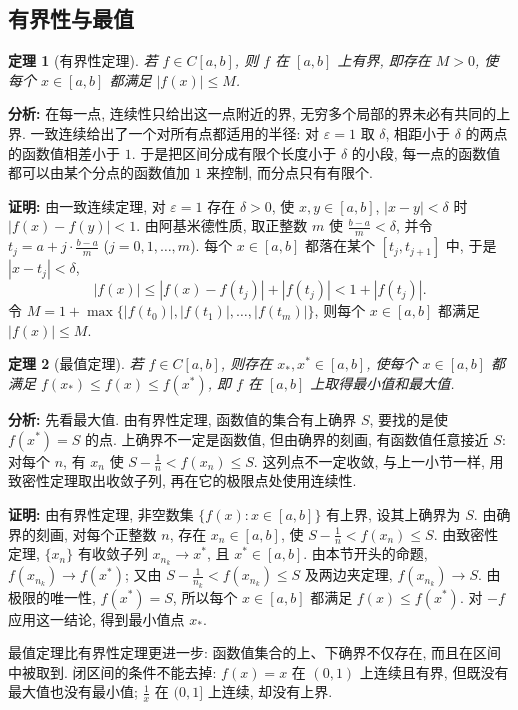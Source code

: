 \documentclass[UTF8,openany]{ctexbook}
\theoremstyle{chinesetextbook}
\newtheorem{theorem}{定理}[section]
\newenvironment{cnproof}{\par\indent\textbf{证明:} \ignorespaces}{\par}
\begin{document}
\subsection{有界性与最值}
\begin{theorem}[有界性定理]
若 $f\in C[a,b]$, 则 $f$ 在 $[a,b]$ 上有界, 即存在 $M>0$, 使每个 $x\in[a,b]$ 都满足 $|f(x)|\le M$.
\end{theorem}
\par\indent\textbf{分析:} 在每一点, 连续性只给出这一点附近的界, 无穷多个局部的界未必有共同的上界. 一致连续给出了一个对所有点都适用的半径: 对 $\varepsilon=1$ 取 $\delta$, 相距小于 $\delta$ 的两点的函数值相差小于 $1$. 于是把区间分成有限个长度小于 $\delta$ 的小段, 每一点的函数值都可以由某个分点的函数值加 $1$ 来控制, 而分点只有有限个.
\begin{cnproof}
由一致连续定理, 对 $\varepsilon=1$ 存在 $\delta>0$, 使 $x,y\in[a,b]$, $|x-y|<\delta$ 时 $|f(x)-f(y)|<1$. 由阿基米德性质, 取正整数 $m$ 使 $\displaystyle\frac{b-a}m<\delta$, 并令 $\displaystyle t_j=a+j\cdot\frac{b-a}m$ ($j=0,1,\ldots,m$). 每个 $x\in[a,b]$ 都落在某个 $[t_j,t_{j+1}]$ 中, 于是 $|x-t_j|<\delta$,
\[
|f(x)|\le|f(x)-f(t_j)|+|f(t_j)|<1+|f(t_j)|.
\]
令 $M=1+\max\{|f(t_0)|,|f(t_1)|,\ldots,|f(t_m)|\}$, 则每个 $x\in[a,b]$ 都满足 $|f(x)|\le M$.
\end{cnproof}
\begin{theorem}[最值定理]
若 $f\in C[a,b]$, 则存在 $x_*,x^*\in[a,b]$, 使每个 $x\in[a,b]$ 都满足 $f(x_*)\le f(x)\le f(x^*)$, 即 $f$ 在 $[a,b]$ 上取得最小值和最大值.
\end{theorem}
\par\indent\textbf{分析:} 先看最大值. 由有界性定理, 函数值的集合有上确界 $S$, 要找的是使 $f(x^*)=S$ 的点. 上确界不一定是函数值, 但由确界的刻画, 有函数值任意接近 $S$: 对每个 $n$, 有 $x_n$ 使 $\displaystyle S-\frac1n<f(x_n)\le S$. 这列点不一定收敛, 与上一小节一样, 用致密性定理取出收敛子列, 再在它的极限点处使用连续性.
\begin{cnproof}
由有界性定理, 非空数集 $\{f(x):x\in[a,b]\}$ 有上界, 设其上确界为 $S$. 由确界的刻画, 对每个正整数 $n$, 存在 $x_n\in[a,b]$, 使 $\displaystyle S-\frac1n<f(x_n)\le S$. 由致密性定理, $\{x_n\}$ 有收敛子列 $x_{n_k}\to x^*$, 且 $x^*\in[a,b]$. 由本节开头的命题, $f(x_{n_k})\to f(x^*)$; 又由 $\displaystyle S-\frac1{n_k}<f(x_{n_k})\le S$ 及两边夹定理, $f(x_{n_k})\to S$. 由极限的唯一性, $f(x^*)=S$, 所以每个 $x\in[a,b]$ 都满足 $f(x)\le f(x^*)$. 对 $-f$ 应用这一结论, 得到最小值点 $x_*$.
\end{cnproof}
最值定理比有界性定理更进一步: 函数值集合的上、下确界不仅存在, 而且在区间中被取到. 闭区间的条件不能去掉: $f(x)=x$ 在 $(0,1)$ 上连续且有界, 但既没有最大值也没有最小值; $\displaystyle\frac1x$ 在 $(0,1]$ 上连续, 却没有上界.
\end{document}
